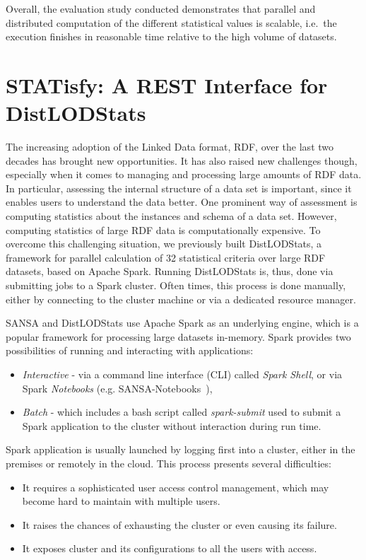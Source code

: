 Overall, the evaluation study conducted demonstrates that parallel and distributed computation of the different statistical values is scalable, i.e.~the execution finishes in reasonable time relative to the high volume of datasets.


\section{STATisfy: A REST Interface for DistLODStats}
\label{sec:distlodstats-statisfy}
The increasing adoption of the Linked Data format, RDF, over the last two decades has brought new opportunities.
It has also raised new challenges though, especially when it comes to managing and processing large amounts of RDF data.
In particular, assessing the internal structure of a data set is important, since it enables users to understand the data better.
One prominent way of assessment is computing statistics about the instances and schema of a data set.
However, computing statistics of large RDF data is computationally expensive.
To overcome this challenging situation, we previously built DistLODStats, a framework for parallel calculation of 32 statistical criteria over large RDF datasets, based on Apache Spark.
Running DistLODStats is, thus, done via submitting jobs to a Spark cluster.
Often times, this process is done manually, either by connecting to the cluster machine or via a dedicated resource manager. 

SANSA and DistLODStats use Apache Spark as an underlying engine, which is a popular framework for processing large datasets in-memory.
Spark provides two possibilities of running and interacting with applications: 
\begin{itemize}
    \item \textit{Interactive} - via a command line interface (CLI) called \textit{Spark Shell}, or via Spark \textit{Notebooks} (e.g. SANSA-Notebooks~\cite{iermilov-2017-sansa-iswc-demo}),
    \item \textit{Batch} - which includes a bash script called \textit{spark-submit} used to submit a Spark application to the cluster without interaction during run time.
\end{itemize}

Spark application is usually launched by logging first into a cluster, either in the premises or remotely in the cloud. This process presents several difficulties:
\begin{itemize}
    \item It requires a sophisticated user access control management, which may become hard to maintain with multiple users.
    \item It raises the chances of exhausting the cluster or even causing its failure.
    \item It exposes cluster and its configurations to all the users with access.
\end{itemize}

